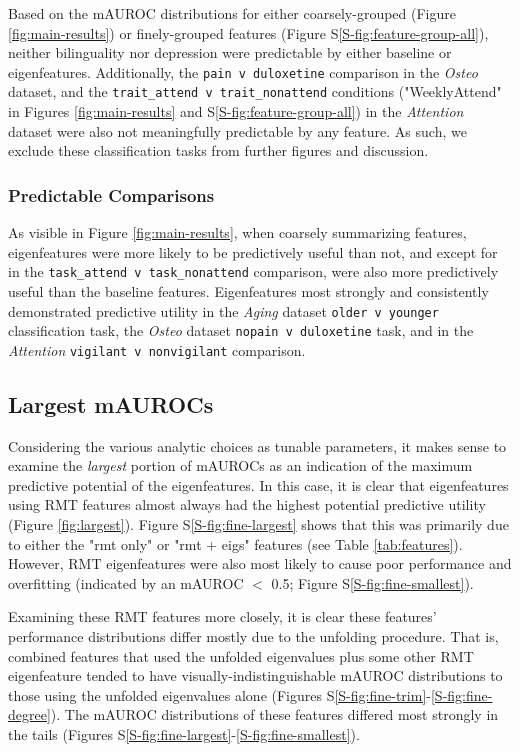 \documentclass[12pt]{spieman}  %
\newcommand{\code}[1]{\small\texttt{#1}\normalsize}
\begin{document}
\begin{spacing}{2}
Based on the mAUROC distributions for either coarsely-grouped (Figure
\ref{fig:main-results}) or finely-grouped features (Figure
S\ref{S-fig:feature-group-all}), neither bilinguality nor depression were
predictable by either baseline or eigenfeatures. Additionally, the \code{pain v
duloxetine} comparison in the \textit{Osteo} dataset, and the
\code{trait\_attend v trait\_nonattend} conditions ("WeeklyAttend" in Figures
\ref{fig:main-results} and S\ref{S-fig:feature-group-all}) in the \textit{Attention}
dataset were also not meaningfully predictable by any feature. As such, we exclude
these classification tasks from further figures and discussion.

\subsubsection{Predictable Comparisons}
As visible in Figure \ref{fig:main-results}, when coarsely summarizing
features, eigenfeatures were more likely to be predictively useful than not,
and except for in the \code{task\_attend v task\_nonattend} comparison, were
also more predictively useful than the baseline features.  Eigenfeatures most
strongly and consistently demonstrated predictive utility in the \textit{Aging}
dataset \code{older v younger} classification task, the \textit{Osteo} dataset
\code{nopain v duloxetine} task, and in the \textit{Attention} \code{vigilant v
nonvigilant} comparison.



\subsection{Largest mAUROCs}
\label{sec:unfolding-importance}
Considering the various analytic choices as tunable parameters, it makes sense
to examine the \textit{largest} portion of mAUROCs as an indication of the
maximum predictive potential of the eigenfeatures. In this case, it is clear
that eigenfeatures using RMT features almost always had the highest potential
predictive utility (Figure \ref{fig:largest}). Figure S\ref{S-fig:fine-largest}
shows that this was primarily due to either the "rmt only" or "rmt + eigs"
features (see Table \ref{tab:features}). However, RMT eigenfeatures were also most
likely to cause poor performance and overfitting (indicated by an mAUROC \(<\)
0.5; Figure S\ref{S-fig:fine-smallest}).

Examining these RMT features more closely, it is clear these features'
performance distributions differ mostly due to the unfolding procedure. That
is, combined features that used the unfolded eigenvalues plus some other RMT
eigenfeature tended to have visually-indistinguishable mAUROC distributions to
those using the unfolded eigenvalues alone (Figures
S\ref{S-fig:fine-trim}-\ref{S-fig:fine-degree}). The mAUROC distributions of
these features differed most strongly in the tails (Figures
S\ref{S-fig:fine-largest}-\ref{S-fig:fine-smallest}).



\end{spacing}
\end{document}
